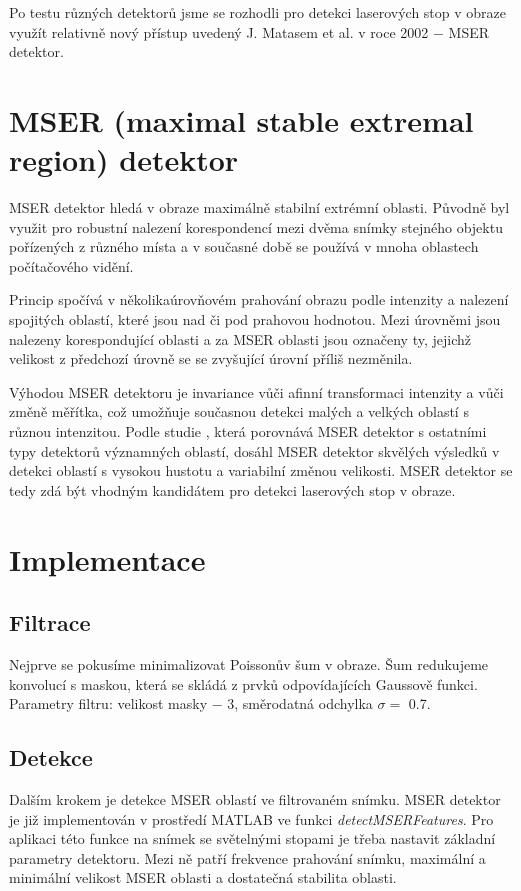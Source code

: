 Po testu různých detektorů jsme se rozhodli pro detekci laserových stop v obraze využít relativně nový přístup uvedený J. Matasem et al. \cite{Matas} v roce 2002 $-$ MSER detektor. 




\section{MSER (maximal stable extremal region) detektor}

MSER detektor hledá v obraze maximálně stabilní extrémní oblasti. Původně byl využit pro robustní nalezení korespondencí mezi dvěma snímky stejného objektu pořízených z různého místa a v současné době se používá v mnoha oblastech počítačového vidění.  

Princip spočívá v několikaúrovňovém prahování obrazu podle intenzity a nalezení spojitých oblastí, které jsou nad či pod prahovou hodnotou. Mezi úrovněmi jsou nalezeny korespondující oblasti a za MSER oblasti jsou označeny ty, jejichž velikost z předchozí úrovně se se zvyšující úrovní příliš nezměnila. 

Výhodou MSER detektoru je invariance vůči afinní transformaci intenzity a vůči změně měřítka, což umožňuje současnou detekci malých a velkých oblastí s různou intenzitou. Podle studie \cite{Comparison}, která porovnává MSER detektor s ostatními typy detektorů významných oblastí, dosáhl MSER detektor skvělých výsledků v detekci oblastí s vysokou hustotu a variabilní změnou velikosti. MSER detektor se tedy zdá být vhodným kandidátem pro detekci laserových stop v obraze.

\section{Implementace}

\subsection{Filtrace}
   Nejprve se pokusíme minimalizovat Poissonův šum v obraze. Šum redukujeme konvolucí s maskou, která se skládá z prvků odpovídajících Gaussově funkci. Parametry filtru: velikost masky $-$ \SI{3}{\px}, směrodatná odchylka $\sigma = $ \SI{0.7}{\px}.

\subsection{Detekce} 
   Dalším krokem je detekce MSER oblastí ve filtrovaném snímku. MSER detektor je již implementován v prostředí MATLAB ve funkci \textit{detectMSERFeatures}. Pro aplikaci této funkce na snímek se světelnými stopami je třeba nastavit základní parametry detektoru. Mezi ně patří frekvence prahování snímku, maximální a minimální velikost MSER oblasti a dostatečná stabilita oblasti. 
   
